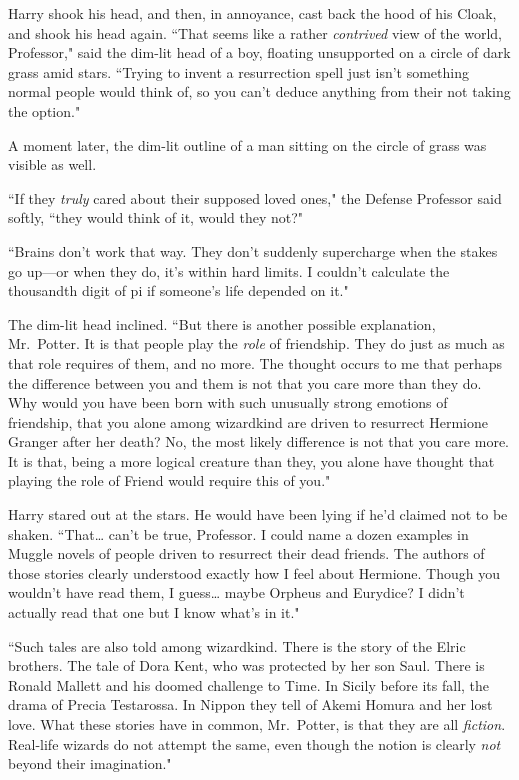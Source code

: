 Harry shook his head, and then, in annoyance, cast back the hood of his Cloak, and shook his head again. ``That seems like a rather \emph{contrived} view of the world, Professor," said the dim-lit head of a boy, floating unsupported on a circle of dark grass amid stars. ``Trying to invent a resurrection spell just isn't something normal people would think of, so you can't deduce anything from their not taking the option."

A moment later, the dim-lit outline of a man sitting on the circle of grass was visible as well.

``If they \emph{truly} cared about their supposed loved ones," the Defense Professor said softly, ``they would think of it, would they not?"

``Brains don't work that way. They don't suddenly supercharge when the stakes go up---or when they do, it's within hard limits. I couldn't calculate the thousandth digit of pi if someone's life depended on it."

The dim-lit head inclined. ``But there is another possible explanation, Mr.~Potter. It is that people play the \emph{role} of friendship. They do just as much as that role requires of them, and no more. The thought occurs to me that perhaps the difference between you and them is not that you care more than they do. Why would you have been born with such unusually strong emotions of friendship, that you alone among wizardkind are driven to resurrect Hermione Granger after her death? No, the most likely difference is not that you care more. It is that, being a more logical creature than they, you alone have thought that playing the role of Friend would require this of you."

Harry stared out at the stars. He would have been lying if he'd claimed not to be shaken. ``That{\ldots} can't be true, Professor. I could name a dozen examples in Muggle novels of people driven to resurrect their dead friends. The authors of those stories clearly understood exactly how I feel about Hermione. Though you wouldn't have read them, I guess{\ldots} maybe Orpheus and Eurydice? I didn't actually read that one but I know what's in it."

``Such tales are also told among wizardkind. There is the story of the Elric brothers. The tale of Dora Kent, who was protected by her son Saul. There is Ronald Mallett and his doomed challenge to Time. In Sicily before its fall, the drama of Precia Testarossa. In Nippon they tell of Akemi Homura and her lost love. What these stories have in common, Mr.~Potter, is that they are all \emph{fiction}. Real-life wizards do not attempt the same, even though the notion is clearly \emph{not} beyond their imagination."

